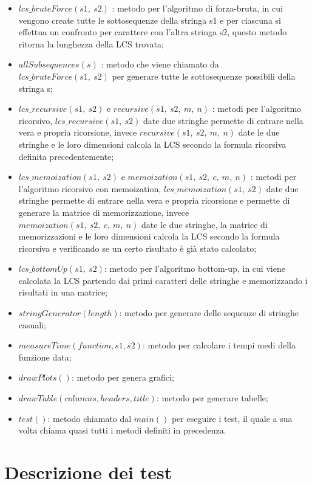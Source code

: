\documentclass{article}
\begin{document}
\begin{itemize}
    \item $lcs\_bruteForce(s1,\ s2)$ : metodo per l'algoritmo di forza-bruta, in cui vengono create tutte le sottosequenze della stringa s1 e per ciascuna si effettua un confronto per carattere con l'altra stringa s2, questo metodo ritorna la lunghezza della LCS trovata;
    \item $allSubsequences(s)$ : metodo che viene chiamato da $lcs\_bruteForce(s1,\ s2)$ per generare tutte le sottosequenze possibili della stringa s;
    \item $lcs\_recursive(s1,\ s2)$ e $recursive(s1,\ s2,\ m,\ n)$ : metodi per l'algoritmo ricorsivo, $lcs\_recursive(s1,\ s2)$ date due stringhe permette di entrare nella vera e propria ricorsione, invece $recursive(s1,\ s2,\ m,\ n)$ date le due stringhe e le loro dimensioni calcola la LCS secondo la formula ricorsiva definita precedentemente; 
    \item $lcs\_memoization(s1,\ s2)$ e $memoization(s1,\ s2,\ c,\ m,\ n)$ : metodi per l'algoritmo ricorsivo con memoization, $lcs\_memoization(s1,\ s2)$ date due stringhe permette di entrare nella vera e propria ricorsione e permette di generare la matrice di memorizzazione, invece $memoization(s1,\ s2,\ c,\ m,\ n)$ date le due stringhe, la matrice di memorizzazioni e le loro dimensioni calcola la LCS secondo la formula ricorsiva e verificando se un certo risultato è già stato calcolato;
    \item $lcs\_bottomUp(s1,\ s2)$: metodo per l'algoritmo bottom-up, in cui viene calcolata la LCS partendo dai primi caratteri delle stringhe e memorizzando i risultati in una matrice; 
    \item $stringGenerator(length)$: metodo per generare delle sequenze di stringhe casuali;
    \item $measureTime(function, s1, s2)$: metodo per calcolare i tempi medi della funzione data;
    \item $drawPlots()$: metodo per genera grafici;
    \item $drawTable(columns, headers, title)$: metodo per generare tabelle;
    \item $test()$: metodo chiamato dal $main()$ per eseguire i test, il quale a sua volta chiama quasi tutti i metodi definiti in precedenza.
\end{itemize}

\newpage

\section{Descrizione dei test}
\end{document}
